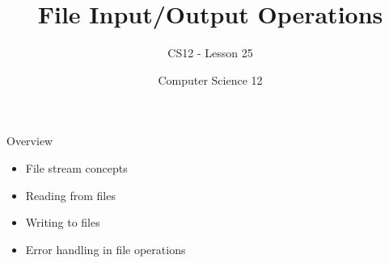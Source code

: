 \documentclass[10pt]{beamer}
\title{File Input/Output Operations}
\subtitle{CS12 - Lesson 25}
\author{Computer Science 12}
\date{}
\begin{document}
\begin{frame}
    \titlepage
\end{frame}

\begin{frame}{Overview}
    \begin{itemize}
        \item File stream concepts
        \item Reading from files
        \item Writing to files
        \item Error handling in file operations
    \end{itemize}
\end{frame}

\end{document}
